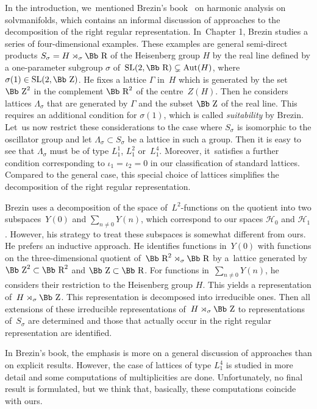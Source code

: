 \documentclass[10pt,a4paper]{amsart}
\newcommand\RR{{\mbox{\Bb R}}}
\newcommand\ZZ{{\mbox{\Bb Z}}}
\newcommand\cH{{\mathcal H}}
\newcommand{\Aut}{\mathop{{\rm Aut}}}
\newcommand{\SL}{\mathop{{\rm SL}}}
\numberwithin{equation}{section}
\begin{document}
\begin{Remark}\label{RBr}
In the introduction, we~mentioned Brezin's book~\cite{Br} on harmonic analysis on solvmanifolds, which contains an informal discussion of approaches to the decomposition of the right regular representation. In~Chapter 1, Brezin studies a series of four-dimensional examples. These examples are general semi-direct products $S_\sigma=H\rtimes _\sigma\RR$ of the Heisenberg group $H$ by the real line defined by a one-parameter subgroup $\sigma$ of~$\SL(2,\RR)\subsetneq \Aut(H)$, where $\sigma(1)\in\SL(2,\ZZ)$. He fixes a lattice $\Gamma$ in~$H$ which is generated by the set $\ZZ^2$ in the complement $\RR^2$ of the centre~$Z(H)$. Then he considers lattices $\Lambda_\sigma$ that are generated by $\Gamma$ and the subset $\ZZ$ of the real line. This requires an additional condition for $\sigma(1)$, which is called \emph{suitability} by Brezin. Let~us now restrict these considerations to the case where $S_\sigma$ is isomorphic to the oscillator group and let $\Lambda_\sigma\subset S_\sigma$ be a lattice in such a group. Then it is easy to see that $\Lambda_\sigma$ must be of type $L_1^1$, $L_1^{2}$ or~$L_1^{4}$. Moreover, it~satisfies a further condition corresponding to $\iota_1=\iota_2=0$ in our classification of standard lattices. Compared to the general case, this special choice of lattices simplifies the decomposition of the right regular representation.

Brezin uses a decomposition of the space of~$L^2$-functions on the quotient into two subspaces~$Y(0)$ and $\sum_{n\not=0}Y(n)$, which correspond to our spaces $\cH_0$ and $\cH_1$. However, his strategy to treat these subspaces is somewhat different from ours. He prefers an inductive approach. He identifies functions in~$Y(0)$ with functions on the three-dimensional quotient of~$\RR^2\rtimes_\sigma\RR$ by a~lattice generated by $\ZZ^2\subset\RR^2$ and $\ZZ\subset\RR$. For functions in~$\sum_{n\not=0}Y(n)$, he considers their restriction to the Heisenberg group $H$. This yields a representation of~$H\rtimes_\sigma \ZZ$. This representation is decomposed into irreducible ones. Then all extensions of these irreducible representations of~$H\rtimes_\sigma \ZZ$ to representations of~$S_\sigma$ are determined and those that actually occur in the right regular representation are identified.

In Brezin's book, the emphasis is more on a general discussion of approaches than on explicit results.
However, the case of lattices of type $L_1^{4}$ is studied in more detail and some computations of multiplicities are done. Unfortunately, no final result is formulated, but we think that, basically, these computations coincide with ours.
\end{Remark}
\end{document}
